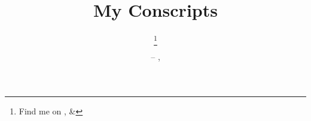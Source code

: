 \title{My Conscripts}
\author{%
	\thanks{%
		Find me on
			,
			\&
	}%
}
\date{%
	--
	\DTMmonthname{\number\month}
	\number\day,
	\number\year%
}